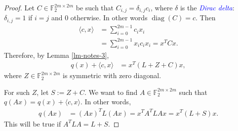 \documentclass[12pt,a4paper]{article}
\newcommand{\mb}[1]{\mathbb{#1}}
\newcommand{\F}{\mb{F}}
\newcommand{\Emph}[1]{\emph{\textcolor{blue}{#1}}}
\newcommand{\diag}[1]{\operatorname{diag}\left(#1\right)}
\begin{document}
\begin{proof}
Let $C \in \F_2^{2 m \times 2 m}$ be such that $C_{i,j} = \delta_{i,j} c_i$, where $\delta$ is the
\Emph{Dirac delta}: $\delta_{i,j}=1$ if $i=j$ and $0$ otherwise.
In other words $\diag{C} = c$.
Then
\begin{align*}
\langle c, x \rangle
&=
\sum_{i=0}^{2m-1} c_i x_i
\\
&=
\sum_{i=0}^{2m-1} x_i c_i x_i
=
x^T C x.
\end{align*}
Therefore, by Lemma \ref{lm-notes-3},
\begin{align*}
q(x) + \langle c, x \rangle
&=
x^T (L + Z + C) x,
\end{align*}
where $Z \in \F_2^{2 m \times 2 m}$ is symmetric with zero diagonal.

For such $Z$, let $S := Z + C$.
We want to find $A \in \F_2^{2 m \times 2 m}$ such that $q(A x) = q(x) + \langle c, x \rangle.$
In other words,
\begin{align*}
q(A x)
&=
(A x)^T L (A x)
=
x^T A^T L A x
=
x^T (L + S) x.
\end{align*}
This will be true if $A^T L A = L + S.$


\end{proof}
\end{document}
